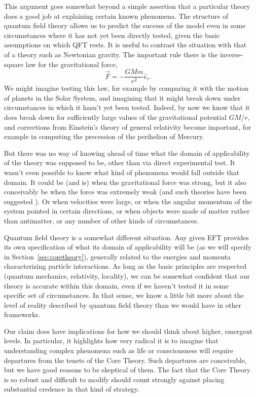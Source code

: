 \documentclass[12pt,letterpaper]{article}
\newcommand{\be}{\begin{equation}}
\newcommand{\ee}{\end{equation}}
\begin{document}
This argument goes somewhat beyond a simple assertion that a particular theory does a good job at explaining certain known phenomena.
The structure of quantum field theory allows us to predict the success of the model even in some circumstances where it has not yet been directly tested, given the basic assumptions on which QFT rests.
It is useful to contrast the situation with that of a theory such as Newtonian gravity.
The important rule there is the inverse-square law for the gravitational force,
\be
  \vec F = - \frac{GMm}{r^2} \hat{e}_r.
\ee
We might imagine testing this law, for example by comparing it with the motion of planets in the Solar System, and imagining that it might break down under circumstances in which it hasn't yet been tested.
Indeed, by now we know that it does break down for sufficiently large values of the gravitational potential $GM/r$, and corrections from Einstein's theory of general relativity become important, for example in computing the precession of the perihelion of Mercury.

But there was no way of knowing ahead of time what the domain of applicability of the theory was supposed to be, other than via direct experimental test.
It wasn't even possible to know what kind of phenomena would fall outside that domain.
It could be (and is) when the gravitational force was strong, but it also conceivably be when the force was extremely weak (and such theories have been suggested \citep{milgrom1983modification}).
Or when velocities were large, or when the angular momentum of the system pointed in certain directions, or when objects were made of matter rather than antimatter, or any number of other kinds of circumstances.

Quantum field theory is a somewhat different situation.
Any given EFT provides its own specification of what its domain of applicability will be (as we will specify in Section~\ref{sec:coretheory}), generally related to the energies and momenta characterizing particle interactions.
As long as the basic principles are respected (quantum mechanics, relativity, locality), we can be somewhat confident that our theory is accurate within this domain, even if we haven't tested it in some specific set of circumstances.
In that sense, we know a little bit more about the level of reality described by quantum field theory than we would have in other frameworks.

Our claim does have implications for how we should think about higher, emergent levels.
In particular, it highlights how very radical it is to imagine that understanding complex phenomena such as life or consciousness will require departures from the tenets of the Core Theory.
Such departures are conceivable, but we have good reasons to be skeptical of them.
The fact that the Core Theory is so robust and difficult to modify should count strongly against placing substantial credence in that kind of strategy.
\end{document}
